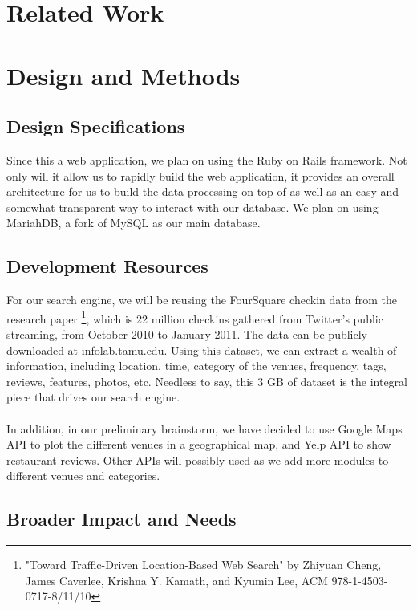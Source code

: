 \documentclass{article}
\begin{document}
\section{Related Work}

\section{Design and Methods}
\subsection{Design Specifications}
Since this a web application, we plan on using the Ruby on Rails framework. Not only will it allow us
to rapidly build the web application, it provides an overall architecture for us to build the data processing
on top of as well as an easy and somewhat transparent way to interact with our database. We plan on using
MariahDB, a fork of MySQL as our main database.

\subsection{Development Resources}
For our search engine, we will be reusing the FourSquare checkin data from the research paper
\footnote{"Toward Traffic-Driven Location-Based Web Search" by Zhiyuan Cheng, James Caverlee, Krishna Y. Kamath, and Kyumin Lee, ACM 978-1-4503-0717-8/11/10},
which is 22 million checkins gathered from Twitter's public streaming, from October 2010 to January 2011. 
The data can be publicly downloaded at \href{http://infolab.tamu.edu/static/users/zhiyuan/icwsm_2011.zip}{infolab.tamu.edu}.
Using this dataset, we can extract a wealth of information, including location, time, category of the
venues, frequency, tags, reviews, features, photos, etc. Needless to say, this 3 GB of dataset is the
integral piece that drives our search engine.
\\ \\
In addition, in our preliminary brainstorm, we have decided to use Google Maps API to plot the different
venues in a geographical map, and Yelp API to show restaurant reviews. Other APIs will possibly used
as we add more modules to different venues and categories.

\subsection{Broader Impact and Needs}
\end{document}
